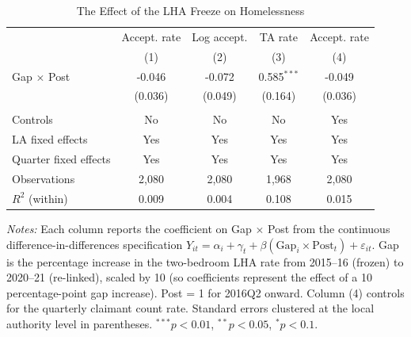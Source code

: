 \begin{table}[t]
\centering
\caption{The Effect of the LHA Freeze on Homelessness}
\label{tab:main}
\begin{tabular}{lcccc}
\hline\hline
 & \multicolumn{1}{c}{Accept. rate} & \multicolumn{1}{c}{Log accept.} & \multicolumn{1}{c}{TA rate} & \multicolumn{1}{c}{Accept. rate} \\
 & \multicolumn{1}{c}{(1)} & \multicolumn{1}{c}{(2)} & \multicolumn{1}{c}{(3)} & \multicolumn{1}{c}{(4)} \\
\hline
Gap $\times$ Post & -0.046 & -0.072 & 0.585$^{***}$ & -0.049 \\
 & (0.036) & (0.049) & (0.164) & (0.036) \\
\\
Controls & No & No & No & Yes \\
LA fixed effects & Yes & Yes & Yes & Yes \\
Quarter fixed effects & Yes & Yes & Yes & Yes \\
Observations & 2,080 & 2,080 & 1,968 & 2,080 \\
$R^2$ (within) & 0.009 & 0.004 & 0.108 & 0.015 \\
\hline\hline
\end{tabular}
\begin{tablenotes}
\small
\item \textit{Notes:} Each column reports the coefficient on Gap $\times$ Post from the continuous difference-in-differences specification $Y_{it} = \alpha_i + \gamma_t + \beta(\text{Gap}_i \times \text{Post}_t) + \varepsilon_{it}$. Gap is the percentage increase in the two-bedroom LHA rate from 2015--16 (frozen) to 2020--21 (re-linked), scaled by 10 (so coefficients represent the effect of a 10 percentage-point gap increase). Post = 1 for 2016Q2 onward. Column (4) controls for the quarterly claimant count rate. Standard errors clustered at the local authority level in parentheses. $^{***}p<0.01$, $^{**}p<0.05$, $^{*}p<0.1$.
\end{tablenotes}
\end{table}
